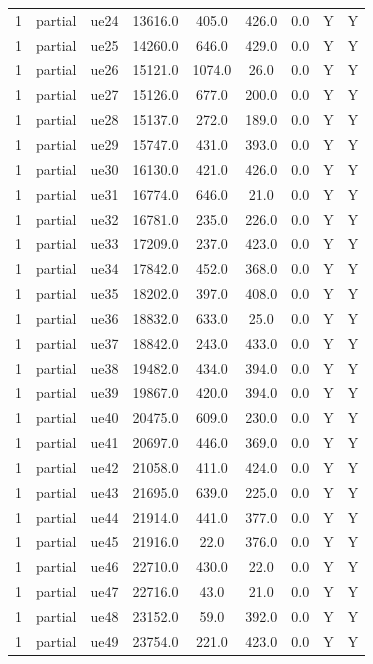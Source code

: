 \begin{table}[ht]
\begin{tabular}{|c|c|c|c|c|c|c|c|c|}
1 & partial & ue24 & 13616.0 & 405.0 & 426.0 & 0.0 & Y & Y \\
1 & partial & ue25 & 14260.0 & 646.0 & 429.0 & 0.0 & Y & Y \\
1 & partial & ue26 & 15121.0 & 1074.0 & 26.0 & 0.0 & Y & Y \\
1 & partial & ue27 & 15126.0 & 677.0 & 200.0 & 0.0 & Y & Y \\
1 & partial & ue28 & 15137.0 & 272.0 & 189.0 & 0.0 & Y & Y \\
1 & partial & ue29 & 15747.0 & 431.0 & 393.0 & 0.0 & Y & Y \\
1 & partial & ue30 & 16130.0 & 421.0 & 426.0 & 0.0 & Y & Y \\
1 & partial & ue31 & 16774.0 & 646.0 & 21.0 & 0.0 & Y & Y \\
1 & partial & ue32 & 16781.0 & 235.0 & 226.0 & 0.0 & Y & Y \\
1 & partial & ue33 & 17209.0 & 237.0 & 423.0 & 0.0 & Y & Y \\
1 & partial & ue34 & 17842.0 & 452.0 & 368.0 & 0.0 & Y & Y \\
1 & partial & ue35 & 18202.0 & 397.0 & 408.0 & 0.0 & Y & Y \\
1 & partial & ue36 & 18832.0 & 633.0 & 25.0 & 0.0 & Y & Y \\
1 & partial & ue37 & 18842.0 & 243.0 & 433.0 & 0.0 & Y & Y \\
1 & partial & ue38 & 19482.0 & 434.0 & 394.0 & 0.0 & Y & Y \\
1 & partial & ue39 & 19867.0 & 420.0 & 394.0 & 0.0 & Y & Y \\
1 & partial & ue40 & 20475.0 & 609.0 & 230.0 & 0.0 & Y & Y \\
1 & partial & ue41 & 20697.0 & 446.0 & 369.0 & 0.0 & Y & Y \\
1 & partial & ue42 & 21058.0 & 411.0 & 424.0 & 0.0 & Y & Y \\
1 & partial & ue43 & 21695.0 & 639.0 & 225.0 & 0.0 & Y & Y \\
1 & partial & ue44 & 21914.0 & 441.0 & 377.0 & 0.0 & Y & Y \\
1 & partial & ue45 & 21916.0 & 22.0 & 376.0 & 0.0 & Y & Y \\
1 & partial & ue46 & 22710.0 & 430.0 & 22.0 & 0.0 & Y & Y \\
1 & partial & ue47 & 22716.0 & 43.0 & 21.0 & 0.0 & Y & Y \\
1 & partial & ue48 & 23152.0 & 59.0 & 392.0 & 0.0 & Y & Y \\
1 & partial & ue49 & 23754.0 & 221.0 & 423.0 & 0.0 & Y & Y \\

\end{tabular}
\end{table}
